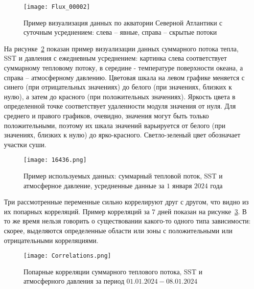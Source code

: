 \begin{figure}[!h]
	\centering
	\texttt{[image: Flux\_00002]}
	\caption{Пример визуализация данных по акватории Северной Атлантики с суточным усреднением: слева -- явные, справа -- скрытые потоки}
	\label{fig:flux_example}
\end{figure}


На рисунке~\ref{fig:data_example} показан пример визуализации данных суммарного потока тепла, SST и давления с ежедневным усреднением: картинка слева соответствует суммарному тепловому потоку, в середине - температуре поверхности океана, а справа -- атмосферному давлению. Цветовая шкала на левом графике меняется с синего (при отрицательных значениях) до белого (при значениях, близких к нулю), а затем до красного (при положительных значениях). Яркость цвета в определенной точке соответствует удаленности модуля значения от нуля. Для среднего и правого графиков, очевидно, значения могут быть только положительными, поэтому их шкала значений варьируется от белого (при значениях, близких к нулю) до ярко-красного. Светло-зеленый цвет обозначает участки суши.


\begin{figure}
	\centering
	\texttt{[image: 16436.png]}
	\caption{Пример используемых данных: суммарный тепловой поток, SST и атмосферное давление, усредненные данные за $1$ января $2024$ года}
	\label{fig:data_example}
\end{figure}

Три рассмотренные переменные сильно коррелируют друг с другом, что видно из их попарных корреляций. Пример корреляций за $7$ дней показан на рисунке~\ref{fig:correlations}. В то же время нельзя говорить о существовании какого-то одного типа зависимости: скорее, выделяются определенные области или зоны с положительными или отрицательными корреляциями.

\begin{figure}
	\centering
	\texttt{[image: Correlations.png]}
	\caption{Попарные корреляции суммарного теплового потока, SST и атмосферного давления за период $01.01.2024-08.01.2024$}
	\label{fig:correlations}
\end{figure}


